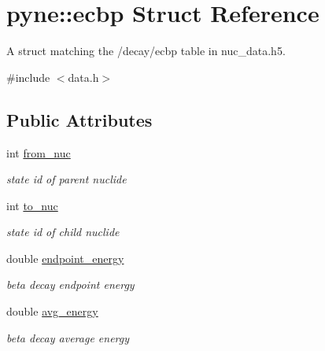 \hypertarget{structpyne_1_1ecbp}{}\section{pyne\+:\+:ecbp Struct Reference}
\label{structpyne_1_1ecbp}


A struct matching the \textquotesingle{}/decay/ecbp\textquotesingle{} table in nuc\+\_\+data.\+h5.  




{\ttfamily \#include $<$data.\+h$>$}

\subsection*{Public Attributes}
\begin{DoxyCompactItemize}
\item 
\mbox{\label{structpyne_1_1ecbp_a0f0a1b5d1058f568e1a9c272a8ccdbb4}} 
int \hyperlink{structpyne_1_1ecbp_a0f0a1b5d1058f568e1a9c272a8ccdbb4}{from\+\_\+nuc}
\begin{DoxyCompactList}\small\item\em state id of parent nuclide \end{DoxyCompactList}\item 
\mbox{\label{structpyne_1_1ecbp_a92cad3076b4ede90958ff54a5d42d9c6}} 
int \hyperlink{structpyne_1_1ecbp_a92cad3076b4ede90958ff54a5d42d9c6}{to\+\_\+nuc}
\begin{DoxyCompactList}\small\item\em state id of child nuclide \end{DoxyCompactList}\item 
\mbox{\label{structpyne_1_1ecbp_aa45b0d60f6e64b89f9eb7f6ecac34075}} 
double \hyperlink{structpyne_1_1ecbp_aa45b0d60f6e64b89f9eb7f6ecac34075}{endpoint\+\_\+energy}
\begin{DoxyCompactList}\small\item\em beta decay endpoint energy \end{DoxyCompactList}\item 
\mbox{\label{structpyne_1_1ecbp_a2ecaf87cb93b936c48f89465958d47f7}} 
double \hyperlink{structpyne_1_1ecbp_a2ecaf87cb93b936c48f89465958d47f7}{avg\+\_\+energy}
\begin{DoxyCompactList}\small\item\em beta decay average energy \end{DoxyCompactList}\item 

\end{DoxyCompactItemize}
